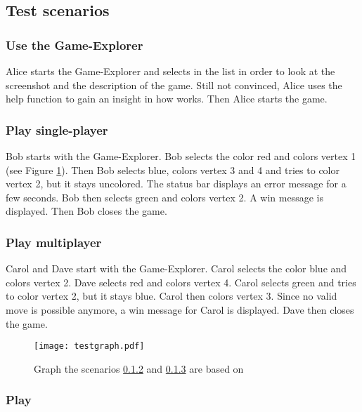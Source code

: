\subsection{Test scenarios}

\subsubsection{Use the Game-Explorer}

Alice starts the Game-Explorer and selects \graphcoloring in the list in order to look at the screenshot and the description of the game. Still not convinced, Alice uses the help function to gain an insight in how \graphcoloring works. Then Alice starts the game.

\subsubsection{Play \graphcoloring single-player} \label{T:GCSingle}

Bob starts \graphcoloring with the Game-Explorer. Bob selects the color red and colors vertex 1 (see Figure \ref{img:TESTGRCOL}). Then Bob selects blue, colors vertex 3 and 4 and tries to color vertex 2, but it stays uncolored. The status bar displays an error message for a few seconds. Bob then selects green and colors vertex 2. A win message is displayed. Then Bob closes the game.

\subsubsection{Play \graphcoloring multiplayer} \label{T:GCMulti}

Carol and Dave start \graphcoloring with the Game-Explorer. Carol selects the color blue and colors vertex 2. Dave selects red and colors vertex 4. Carol selects green and tries to color vertex 2, but it stays blue. Carol then colors vertex 3. Since no valid move is possible anymore, a win message for Carol is displayed. Dave then closes the game.

\begin{figure}[h!]
	\centering
	\texttt{[image: testgraph.pdf]}
	\caption{Graph the scenarios \ref{T:GCSingle} and \ref{T:GCMulti} are based on}
	\label{img:TESTGRCOL}
\end{figure}

\subsubsection{Play \twixt} \label{T:TwixT}

